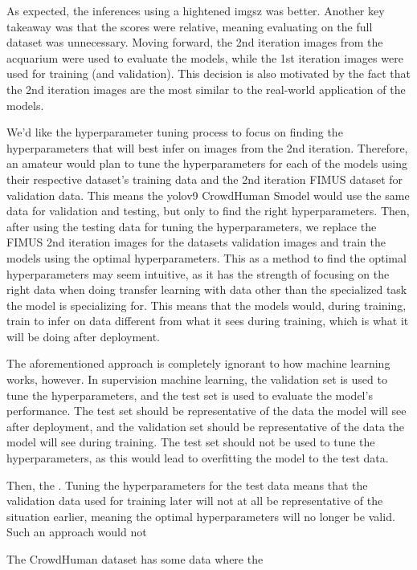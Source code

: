 As expected, the inferences using a hightened imgsz was better. Another key takeaway was that the scores were relative, meaning evaluating on the full dataset was unnecessary. Moving forward, the 2nd iteration images from the acquarium were used to evaluate the models, while the 1st iteration images were used for training (and validation). This decision is also motivated by the fact that the 2nd iteration images are the most similar to the real-world application of the models.

We'd like the hyperparameter tuning process to focus on finding the hyperparameters that will best infer on images from the 2nd iteration. Therefore, an amateur would plan to tune the hyperparameters for each of the models using their respective dataset's training data and the 2nd iteration FIMUS dataset for validation data. This means the yolov9 CrowdHuman Smodel would use the same data for validation and testing, but only to find the right hyperparameters. Then, after using the testing data for tuning the hyperparameters, we replace the FIMUS 2nd iteration images for the datasets validation images and train the models using the optimal hyperparameters. This as a method to find the optimal hyperparameters may seem intuitive, as it has the strength of focusing on the right data when doing transfer learning with data other than the specialized task the model is specializing for. This means that the models would, during training, train to infer on data different from what it sees during training, which is what it will be doing after deployment.

The aforementioned approach is completely ignorant to how machine learning works, however. In supervision machine learning, the validation set is used to tune the hyperparameters, and the test set is used to evaluate the model's performance. The test set should be representative of the data the model will see after deployment, and the validation set should be representative of the data the model will see during training. The test set should not be used to tune the hyperparameters, as this would lead to overfitting the model to the test data.

Then, the . Tuning the hyperparameters for the test data means that the validation data used for training later will not at all be representative of the situation earlier, meaning the optimal hyperparameters will no longer be valid. Such an approach would not 


The CrowdHuman dataset has some data where the 


